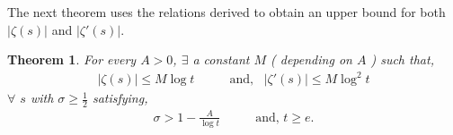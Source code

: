 \documentclass[article,12pt]{elsarticle}
\newtheorem{thm}{Theorem}[section]
\begin{document}
	The next theorem uses the relations derived to obtain an upper bound for both $|\zeta(s)|$ and $|\zeta'(s)|$.
	\begin{thm}\label{thm11}
		For every $A>0$, $\exists$ a constant $M$ ( depending on $A$ ) such that,
		\begin{eqnarray}\label{18}
			|\zeta(s)|\leq M\log t \hspace{20pt} &\mbox{ and,}\hspace{10pt}  |\zeta'(s)|\leq M\log^{2} t
		\end{eqnarray}
		$\forall$ $s$ with $\sigma \geq \frac{1}{2}$ satisfying,
		\begin{eqnarray}\label{19}
			\sigma>1-\frac{A}{\log t } \hspace{20pt} &\mbox{ and, }  t\geq e .
		\end{eqnarray}
	\end{thm}
	
\end{document}
